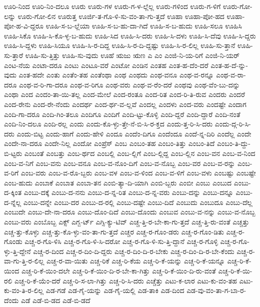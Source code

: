 {ಊರಿ-ನಿಂದ
ಊರಿ-ನಿಂ-ದಲೂ
ಊರು
ಊರು-ಗಳ
ಊರು-ಗ-ಳ-ಲ್ಲೆಲ್ಲ
ಊರು-ಗಳಿಂದ
ಊರು-ಗ-ಳಿಗೆ
ಊರು-ಗೋ-ಲನ್ನು
ಊರು-ಗೋ-ಲಿನ
ಊರುತ್ತ
ಊರ್ಜಿ-ತ-ಗೊ-ಳಿ-ಸು-ವಂ-ತಾ-ಗು-ತ್ತದೆ
ಊಹಾ
ಊಹಾ-ಪೋ-ಹದ
ಊಹಾ-ಪೋ-ಹ-ವಿ-ದ್ದರೂ
ಊಹಿ-ಸ-ಬ-ಲ್ಲೆಯಾ
ಊಹಿ-ಸ-ಬ-ಹು-ದಾ-ಗಿದೆ
ಊಹಿ-ಸ-ಬ-ಹುದು
ಊಹಿ-ಸಲೂ
ಊಹಿಸಿ
ಊಹಿ-ಸಿಕೊ
ಊಹಿ-ಸಿ-ಕೊ-ಳ್ಳ-ಬ-ಹುದು
ಊಹಿ-ಸಿದ
ಊಹಿ-ಸಿ-ದರು
ಊಹಿ-ಸಿ-ದಳು
ಊಹಿ-ಸಿ-ದೆವು
ಊಹಿ-ಸಿ-ದ್ದರು
ಊಹಿ-ಸಿ-ದ್ದಳು
ಊಹಿ-ಸಿಯೂ
ಊಹಿ-ಸಿ-ರ-ದಿದ್ದ
ಊಹಿ-ಸಿ-ರ-ದಿ-ದ್ದಷ್ಟು
ಊಹಿ-ಸಿ-ರ-ಲಿಲ್ಲ
ಊಹಿ-ಸು-ತ್ತಾನೆ
ಊಹಿ-ಸು-ತ್ತಾರೆ
ಊಹಿ-ಸು-ತ್ತಿತ್ತು
ಊಹಿ-ಸು-ವುದು
ಊಹೆ
ಋಜು
ಋಣ
ಎ
ಎಂ
ಎಂಜಿ-ನಿ-ಯ-ರಿಗೆ
ಎಂಜಿ-ನಿ-ಯರ್
ಎಂಟ-ನೆಯ
ಎಂಟಾ-ದರೂ
ಎಂಟು
ಎಂಟೂ-ವರೆ
ಎಂಟೋ
ಎಂಡಿನ
ಎಂತಹ
ಎಂತ-ಹ-ದೆಂ-ದರೆ
ಎಂತ-ಹ-ದೆ-ನ್ನು-ವುದು
ಎಂತ-ಹದೇ
ಎಂತು
ಎಂತೆಂ-ತಹ
ಎಂತೆಂಥಾ
ಎಂಥ
ಎಂಥದು
ಎಂಥ-ವನೂ
ಎಂಥ-ವ-ರನ್ನೂ
ಎಂಥ-ವ-ರಾ-ದರೂ
ಎಂಥ-ವ-ರಿ-ಗಾ-ದರೂ
ಎಂಥ-ವ-ರಿಗೂ
ಎಂಥ-ವರು
ಎಂಥ-ವ-ರೆಂ-ದರೆ
ಎಂಥವು
ಎಂಥ-ವೆಂ-ಬು-ದನ್ನು
ಎಂಥಾ
ಎಂದ
ಎಂದಂ-ತಾ-ಯಿ-ತಲ್ಲ
ಎಂದ-ಮೇಲೆ
ಎಂದ-ರಂತೂ
ಎಂದ-ರಿತ
ಎಂದ-ರಿ-ತಿ-ರುವ
ಎಂದರು
ಎಂದರೆ
ಎಂದ-ರೇನು
ಎಂದ-ರೇ-ನೆಂದು
ಎಂದರ್ಥ
ಎಂದ-ರ್ಥ-ವ-ಲ್ಲವೆ
ಎಂದಲ್ಲ
ಎಂದಳು
ಎಂದ-ವರು
ಎಂದಷ್ಟೇ
ಎಂದಾಗ
ಎಂದಿ-ಗಾ-ದರೂ
ಎಂದಿ-ಗಿಂ-ತಲೂ
ಎಂದಿಗೂ
ಎಂದಿಗೆ
ಎಂದಿ-ಟ್ಟು-ಕೊಳ್ಳಿ
ಎಂದಿ-ದ್ದರೆ
ಎಂದಿ-ದ್ದಾರೆ
ಎಂದಿ-ನಂತೆ
ಎಂದಿ-ನಿಂ-ದಲೂ
ಎಂದಿ-ರಲ್ಲ
ಎಂದು
ಎಂದು-ಕೊ-ಳ್ಳು-ತ್ತೇ-ನೆ-ಬಿ-ಸಿ-ರ-ಕ್ತದ
ಎಂದು-ತ್ತ-ರಿ-ಸಿ-ದರು
ಎಂದು-ದ್ಗ-ರಿ-ಸಿ-ದರು
ಎಂದು-ಬಿಟ್ಟ
ಎಂದು-ಹಾಗೆ
ಎಂದು-ಹೇಳಿ
ಎಂದೂ
ಎಂದೆಂ-ದಿಗೂ
ಎಂದೆಂದೂ
ಎಂದೆ-ನ್ನ-ದಿರಿ
ಎಂದೆಲ್ಲ
ಎಂದೇ
ಎಂದೇ-ನಾ-ದರೂ
ಎಂದೇ-ನಿಲ್ಲ
ಎಂದೋ
ಎಂಪ್ರೆಸ್
ಎಂಬ
ಎಂಬಂ-ತಹ
ಎಂಬಂ-ತಿತ್ತು
ಎಂಬಂ-ತಿದೆ
ಎಂಬಂ-ತಿ-ದ್ದು-ಬಿ-ಟ್ಟರು
ಎಂಬಂತೆ
ಎಂಬತ್ತು
ಎಂಬ-ರ್ಥದ
ಎಂಬಲ್ಲಿ
ಎಂಬ-ಲ್ಲಿಗೆ
ಎಂಬ-ಲ್ಲಿದ್ದ
ಎಂಬ-ಲ್ಲಿನ
ಎಂಬ-ವನ
ಎಂಬ-ವ-ನಿಂದ
ಎಂಬ-ವ-ನಿಗೆ
ಎಂಬ-ವನು
ಎಂಬ-ವನೂ
ಎಂಬ-ವ-ನೊಂ-ದಿಗೆ
ಎಂಬ-ವ-ನೊಬ್ಬ
ಎಂಬ-ವರ
ಎಂಬ-ವ-ರನ್ನು
ಎಂಬ-ವ-ರಿಗೆ
ಎಂಬ-ವರು
ಎಂಬ-ವ-ರೊ-ಬ್ಬರು
ಎಂಬ-ವಳ
ಎಂಬ-ವ-ಳಿಂದ
ಎಂಬ-ವ-ಳಿಗೆ
ಎಂಬ-ವಳು
ಎಂಬಷ್ಟು
ಎಂಬಷ್ಟೇ
ಎಂಬ-ಹುದು
ಎಂಬಾಕೆ
ಎಂಬಾತ
ಎಂಬಾ-ತನ
ಎಂಬಿ-ತ್ಯಾ-ದಿ-ಯಾಗಿ
ಎಂಬಿ-ಬ್ಬರು
ಎಂಬೀ
ಎಂಬು
ಎಂಬುದ
ಎಂಬು-ದ-ಕ್ಕಿಂತ
ಎಂಬು-ದಕ್ಕೆ
ಎಂಬು-ದ-ನನು
ಎಂಬು-ದ-ನ್ನ-ರಿತ
ಎಂಬು-ದ-ನ್ನ-ವರು
ಎಂಬು-ದನ್ನು
ಎಂಬು-ದನ್ನೂ
ಎಂಬು-ದ-ನ್ನೆಲ್ಲ
ಎಂಬು-ದನ್ನೇ
ಎಂಬು-ದರ
ಎಂಬು-ದ-ರಲ್ಲಿ
ಎಂಬು-ದಷ್ಟೇ
ಎಂಬು-ದಿದೆ
ಎಂಬುದು
ಎಂಬುದೂ
ಎಂಬು-ದೆಲ್ಲ
ಎಂಬುದೇ
ಎಂಬು-ದೇ-ನಾ-ದರೂ
ಎಂಬು-ದೊಂ-ದಿದೆ
ಎಂಬು-ದೊಂದು
ಎಂಬುವ
ಎಂಬು-ವ-ನನ್ನು
ಎಂಬು-ವ-ನೊಬ್ಬ
ಎಂಬು-ವರು
ಎಂಬೊಬ್ಬ
ಎಕ್ಸ್
ಎಗ್ಬ-ರ್ಟ್
ಎಗ್ಸಿ-ಕ್ಯು-ಟಿವ್
ಎಚ್ಚ-ತ್ತಿ-ರ-ಬೇ-ಕಾ-ಗು-ತ್ತದೆ
ಎಚ್ಚ-ತ್ತಿ-ರು-ವಂತೆ
ಎಚ್ಚತ್ತು
ಎಚ್ಚ-ತ್ತು-ಕೊಳ್ಳು
ಎಚ್ಚ-ತ್ತು-ಕೊ-ಳ್ಳು-ವಂ-ತಾ-ಗು-ತ್ತದೆ
ಎಚ್ಚರ
ಎಚ್ಚ-ರ-ಗೊಂ-ಡರು
ಎಚ್ಚ-ರ-ಗೊಂ-ಡಿತು
ಎಚ್ಚ-ರ-ಗೊಂಡು
ಎಚ್ಚ-ರ-ಗೊ-ಳಿಸಿ
ಎಚ್ಚ-ರ-ಗೊ-ಳಿ-ಸಿ-ದರೋ
ಎಚ್ಚ-ರ-ಗೊ-ಳಿ-ಸು-ತ್ತಿ-ದ್ದಾನೆ
ಎಚ್ಚ-ರ-ಗೊಳ್ಳಿ
ಎಚ್ಚ-ರ-ಗೊ-ಳ್ಳು-ತ್ತಿ-ದ್ದೇನೆ
ಎಚ್ಚ-ರ-ದಿಂದ
ಎಚ್ಚ-ರ-ದಿಂ-ದಿ-ದ್ದರು
ಎಚ್ಚ-ರ-ದಿಂ-ದಿ-ರ-ಬೇಕು
ಎಚ್ಚ-ರ-ದಿಂ-ದಿ-ರ-ಬೇ-ಕೆಂದು
ಎಚ್ಚ-ರ-ವಾ-ಗು-ತ್ತಿ-ರ-ಲಿಲ್ಲ
ಎಚ್ಚ-ರ-ವಾ-ಯಿತು
ಎಚ್ಚ-ರಿಕೆ
ಎಚ್ಚ-ರಿ-ಕೆಯ
ಎಚ್ಚ-ರಿ-ಕೆ-ಯನ್ನು
ಎಚ್ಚ-ರಿ-ಕೆ-ಯನ್ನೂ
ಎಚ್ಚ-ರಿ-ಕೆ-ಯಿಂದ
ಎಚ್ಚ-ರಿ-ಕೆ-ಯಿಂ-ದಲೇ
ಎಚ್ಚ-ರಿ-ಕೆ-ಯಿಂ-ದಿ-ರ-ಬೇ-ಕಾ-ಗಿತ್ತು
ಎಚ್ಚ-ರಿ-ಕೆ-ಯಿಂ-ದಿ-ರು-ವಂತೆ
ಎಚ್ಚ-ರಿ-ಕೆ-ಯಿ-ರಲಿ
ಎಚ್ಚ-ರಿ-ಕೆ-ಯೆಂ-ದರೆ
ಎಚ್ಚ-ರಿ-ಸ-ಲಾ-ಗಿತ್ತು
ಎಚ್ಚ-ರಿ-ಸಿ-ದರು
ಎಚ್ಚೆತ್ತು
ಎಟು-ಕ-ಲಾರ
ಎಟು-ಕು-ವಂ-ತಹ
ಎಟು-ಕು-ವಂ-ತಿ-ರ-ಲಿಲ್ಲ
ಎಡ-ಗಡೆ
ಎಡ-ಗೈ-ಯನ್ನು
ಎಡ-ಗೈ-ಯಲ್ಲಿ
ಎಡ-ತಾಕಿ
ಎಡ-ದಿಂದ
ಎಡ-ವು-ವಂ-ತಾ-ಗ-ಬಾ-ರ-ದೆಂದು
ಎಡೆ
ಎಡೆ-ಬಿ-ಡದ
ಎಡೆ-ಬಿ-ಡದೆ
}
